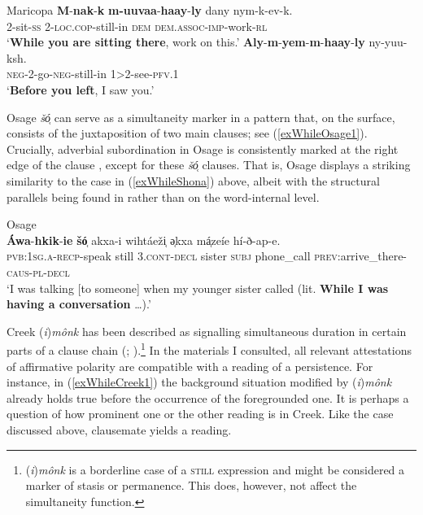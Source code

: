\begin{exe}
	\ex \label{exWhileMaricopa}
	\begin{xlist}
	\exi{}Maricopa
	\ex\label{exWhileMaricopa1}
	\gll \textbf{M}-\textbf{nak}-\textbf{k} \textbf{m}\textbf{-uuvaa}-\textbf{haay}-\textbf{ly} dany nym-k-ev-k.\\
	2-sit-\textsc{ss} 2-\textsc{loc}.\textsc{cop}-still-in \textsc{dem} \textsc{dem}.\textsc{assoc}-\textsc{imp}-work-\textsc{rl}\\
	\glt \lq \textbf{While you are sitting there}, work on this.'
		\ex\label{exWhileMaricopa2}
		\gll \textbf{Aly}-\textbf{m}-\textbf{yem}-\textbf{m}-\textbf{haay}-\textbf{ly} ny-yuu-ksh.\\
		\textsc{neg}-2-go-\textsc{neg}-still-in 1>2-see-\textsc{pfv}.1\\
		\glt \lq \textbf{Before you left}, I saw you.' \parencite[270–271]{Gordon1986}
	\end{xlist}
\end{exe}
Osage \textit{šó̜} can serve as a simultaneity marker in a pattern that, on the surface, consists of the juxtaposition of two main clauses; see (\ref{exWhileOsage1}). Crucially, adverbial subordination in Osage is consistently marked at the right edge of the clause \parencite[444]{Quintero2004}, except for these \textit{šó̜} clauses. That is, Osage displays a striking similarity to the  case in (\ref{exWhileShona}) above, albeit with the structural parallels being found in  rather than on the word-internal level.

\begin{exe}
	\ex Osage\label{exWhileOsage1}\\
	\gll \textbf{Á}\textbf{wa}-\textbf{hkik}-\textbf{ie} \textbf{šó̜} akxa-i wihtáeži̜ ə̜kxa má̜zeíe hí-ð-ap-e.\\
\textsc{pvb}:1\textsc{sg}.\textsc{a}-\textsc{recp}-speak still 3.\textsc{cont}-\textsc{decl} sister \textsc{subj} phone\_call  \textsc{prev}:arrive\_there-\textsc{caus}-\textsc{pl}-\textsc{decl}\\
\glt \lq I was talking [to someone] when my younger sister called (lit. \textbf{While I was having a conversation} …).' \parencite[445]{Quintero2004}
\end{exe}

Creek (\textit{i})\textit{mônk} has been described as signalling simultaneous duration in certain parts of a clause chain (\cite[404]{Martin2011}; \cite[25]{MartinMcKaneMauldin2000}).\footnote{(\textit{i})\textit{mônk} is a borderline case of a \textsc{still} expression and might be considered a marker of stasis or permanence. This does, however, not affect the simultaneity function.} In the materials I consulted, all relevant attestations of affirmative polarity are compatible with a reading of a persistence. For instance, in (\ref{exWhileCreek1}) the background situation modified by (\textit{i})\textit{mônk} already holds true before the occurrence of the foregrounded one. It is perhaps a question of how prominent one or the other reading is in Creek. Like the  case discussed above, clausemate  yields a  reading.\largerpage

